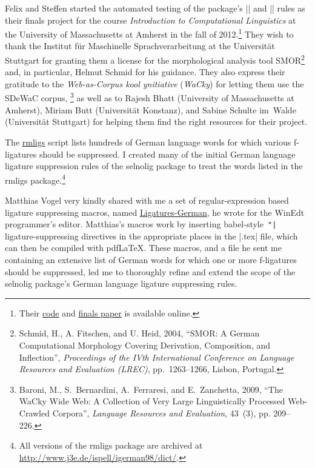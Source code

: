 \documentclass[11pt]{article}
\newcommand{\pkg}[1]{\textsf{#1}}
\begin{document}
Felix and Steffen started the automated testing of the package's |\nolig| and |\keeplig| rules as their finals project for the course \emph{Introduction to Computational Linguistics} at the University of Massachusetts at Amherst in the fall of 2012.\footnote{Their \href{https://github.com/SHildebrandt/selnolig-check}{code} and \href{https://github.com/SHildebrandt/selnolig-check/blob/master/selnolig-check-documentation.pdf?raw=true}{finals paper} is available online.} They wish to thank the Institut für Maschinelle Sprachverarbeitung at the Universität Stuttgart for granting them a license for the morphological analysis tool SMOR\footnote{Schmid, H., A. Fitschen, and U. Heid, 2004, \enquote{SMOR: A German Computational Morphology Covering Derivation, Composition, and Inflection}, \emph{Proceedings of the IVth International Conference on Language Resources and Evaluation (LREC)}, pp.~1263--1266, Lisbon, Portugal.} and, in particular, Helmut Schmid for his guidance. They also express their gratitude to the \emph{Web-as-Corpus kool ynitiative} (\emph{WaCky}) for letting them use the SDeWaC corpus,%
\footnote{Baroni, M., S.~Bernardini, A.~Ferraresi, and E.~Zanchetta, 2009, \enquote{The WaCky Wide Web: A Collection of Very Large Linguistically Processed Web-Crawled Corpora}, \emph{Language Resources and Evaluation}, 43~(3), pp. 209--226.} as well as to Rajesh Bhatt (University of Massachusetts at Amherst), Miriam Butt (Universität Konstanz), and Sabine Schulte im~Walde (Universität Stuttgart) for helping them find the right resources for their project.

The \href{http://www.ctan.org/tex-archive/support/rmligs}{\pkg{rmligs}} script lists hundreds of German language words for which various f\nobreak-liga\-tures should be suppressed. I created many of the initial German language ligature suppression rules of the \pkg{selnolig} package to treat the words listed in the \pkg{rmligs} package.\footnote{All versions of the \pkg{rmligs} package are archived at \url{http://www.j3e.de/ispell/igerman98/dict/}.} 

Matthias Vogel very kindly shared with me a set of regular-expression based ligature suppressing macros, named \href{http://www.winedt.org/Macros/LaTeX/Ligatures-German.php}{Ligatures-German}, he wrote for the WinEdt programmer's editor. Matthias's macros work by inserting \pkg{babel}-style~\Verb+"|+ ligature-suppressing  directives in the appropriate places in the |.tex| file, which can then be compiled with pdf\LaTeX. These macros, and a file he sent me containing an extensive list of German words for which one or more f-ligatures should be suppressed, led me to thoroughly refine and extend the scope of the \pkg{selnolig} package's German language ligature suppressing rules.
\end{document}
